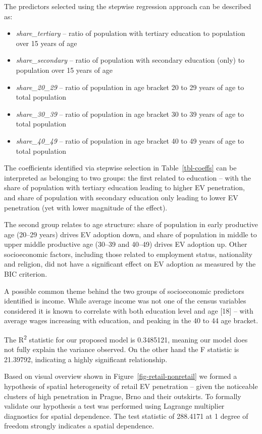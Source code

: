 \documentclass{mmeproc}
\begin{document}
The predictors selected using the stepwise regression approach can be
described as:

\begin{itemize}
\item
  \emph{share\_tertiary} -- ratio of population with tertiary education
  to population over 15 years of age
\item
  \emph{share\_secondary} -- ratio of population with secondary
  education (only) to population over 15 years of age
\item
  \emph{share\_20\_29} -- ratio of population in age bracket 20 to 29
  years of age to total population
\item
  \emph{share\_30\_39} -- ratio of population in age bracket 30 to 39
  years of age to total population
\item
  \emph{share\_40\_49} -- ratio of population in age bracket 40 to 49
  years of age to total population
\end{itemize}

The coefficients identified via stepwise selection in
Table~\ref{tbl-coeffs} can be interpreted as belonging to two groups:
the first related to education -- with the share of population with
tertiary education leading to higher EV penetration, and share of
population with secondary education only leading to lower EV penetration
(yet with lower magnitude of the effect).

The second group relates to age structure: share of population in early
productive age (20--29 years) drives EV adoption down, and share of
population in middle to upper middle productive age (30--39 and 40--49)
drives EV adoption up. Other socioeconomic factors, including those
related to employment status, nationality and religion, did not have a
significant effect on EV adoption as measured by the BIC criterion.

A possible common theme behind the two groups of socioeconomic
predictors identified is income. While average income was not one of the
census variables considered it is known to correlate with both education
level and age {[}18{]} -- with average wages increasing with education,
and peaking in the 40 to 44 age bracket.

The R\textsuperscript{2} statistic for our proposed model is 0.3485121,
meaning our model does not fully explain the variance observed. On the
other hand the F statistic is 21.39792, indicating a highly significant
relationship.

Based on visual overview shown in Figure~\ref{fig-retail-nonretail} we
formed a hypothesis of spatial heterogeneity of retail EV penetration --
given the noticeable clusters of high penetration in Prague, Brno and
their outskirts. To formally validate our hypothesis a test was
performed using Lagrange multiplier diagnostics for spatial dependence.
The test statistic of 288.4171 at 1 degree of freedom strongly indicates
a spatial dependence.
\end{document}
